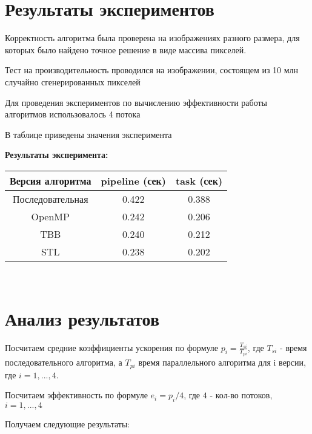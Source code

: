 \documentclass{report}
\begin{document}
\section*{Результаты экспериментов}
\par Корректность алгоритма была проверена на изображениях разного размера, для которых было найдено точное решение в виде массива пикселей.
\par Тест на производительность проводился на изображении, состоящем из 10 млн случайно сгенерированных пикселей
\par Для проведения экспериментов по вычислению эффективности работы алгоритмов использовалось 4 потока
\par В таблице приведены значения эксперимента
\par \textbf{Результаты эксперимента:}
\begin{center}
\begin{tabular}{ ||c | c | c ||  }
    \hline Версия алгоритма & pipeline (сек) & task (сек)\\ 
    \hline Последовательная & 0.422 & 0.388 \\
    \hline OpenMP & 0.242 & 0.206 \\
    \hline TBB & 0.240 & 0.212 \\ 
    \hline STL & 0.238 & 0.202 \\ 
    \hline
\end{tabular}\\[5mm]
\end{center}

\newpage

\section*{Анализ результатов}
\par Посчитаем средние коэффициенты ускорения по формуле $ p_i = \frac{T_{si}}{T_{pi}} $, где $T_{si}$ - время последовательного алгоритма, а $T_{pi}$ время параллельного алгоритма для {i} версии, где $i = {1, ..., 4}$.
\par Посчитаем эффективность по формуле $e_i = p_i / 4$, где $4$ - кол-во потоков, $i = {1, ..., 4}$ 
\par Получаем следующие результаты:
\end{document}
